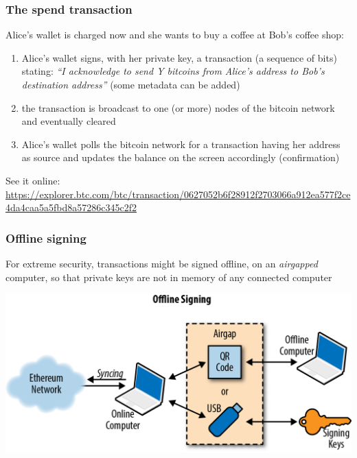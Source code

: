 \documentclass[11pt]{beamer}  %
\begin{document}
\begin{frame}\frametitle{The spend transaction}

  Alice's wallet is charged now and she wants to buy a coffee at Bob's coffee shop:

  \begin{enumerate}
  \item Alice's wallet signs, with her private key, a transaction
    (a sequence of bits) stating: \emph{``I acknowledge to send Y bitcoins from Alice's address
    to Bob's destination address''} (some metadata can be added)
  \item the transaction is broadcast to one (or more) nodes of the
    bitcoin network and eventually cleared
  \item Alice's wallet polls the bitcoin network for a transaction having
    her address as source and updates the balance on the screen
    accordingly (\alert{confirmation})
  \end{enumerate}

  \medskip
  See it online:
  {\scriptsize\url{https://explorer.btc.com/btc/transaction/0627052b6f28912f2703066a912ea577f2ce4da4caa5a5fbd8a57286c345c2f2}}

\end{frame}

\begin{frame}\frametitle{Offline signing}

  \begin{greenbox}{}
    For extreme security, transactions might be signed offline,
    on an \emph{airgapped} computer, so that private keys are not
    in memory of any connected computer
  \end{greenbox}

  \bigskip

  \begin{center}
    \includegraphics[width=\textwidth,clip=false]{pictures/offline_signing.png}
  \end{center}

\end{frame}
\end{document}
